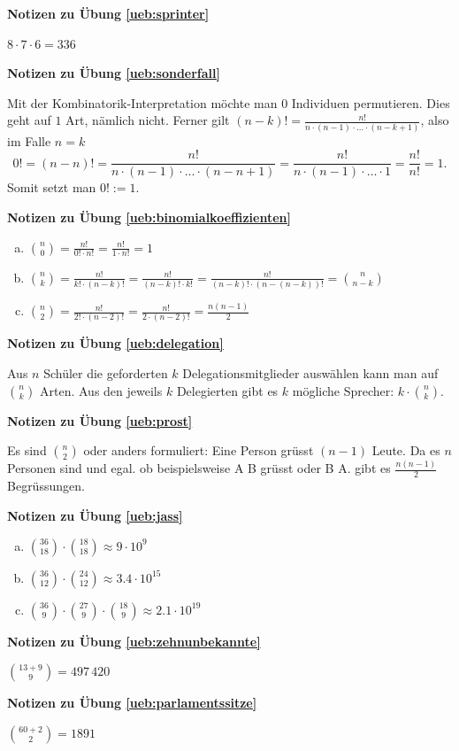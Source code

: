 \documentclass[%
<<<<<<< Updated upstream
<<<<<<< Updated upstream
11pt,%
twoside,%
titlepage,%
german,%
=======
=======
>>>>>>> Stashed changes
11pt,%
twoside,%
titlepage,%
swissgerman,%
<<<<<<< Updated upstream
>>>>>>> Stashed changes
=======
>>>>>>> Stashed changes
headsepline%
]{scrartcl}
\newcommand{\faReturnGray}{\textcolor{gray}{\faMailReply}} %
\theoremstyle{definition}
\theoremstyle{plain}
\newcommand{\concatueb}[1]{ueb:#1}%
\newcommand{\concatlsg}[1]{lsg:#1}%
\newenvironment{lsg}[1]{%
    \par\noindent\textbf{Notizen zu Übung \ref{\concatueb{#1}}}\label{\concatlsg{#1}}
    \hfill\hyperref[\concatueb{#1}]{\faReturnGray}\par %
}{%
    \par%
}
\newcommand{\concatueb}[1]{ueb:#1}%
\newcommand{\concatlsg}[1]{lsg:#1}%
\newenvironment{lsg}[1]{%
    \par\noindent\textbf{Notizen zu Übung \ref{\concatueb{#1}}.}%
    \label{\concatlsg{#1}}
}{%
    \par%
}
\begin{document}
\begin{lsg}{sprinter}
$8\cdot7\cdot6=336$
\end{lsg}
\begin{lsg}{sonderfall}
Mit der Kombinatorik-Interpretation m\"ochte man $0$ Individuen permutieren. Dies geht auf $1$ Art, n\"amlich nicht. Ferner gilt $(n-k)!=\frac{n!}{n\cdot(n-1)\cdot\dots\cdot(n-k+1)}$, also im Falle $n=k$
$$0!=(n-n)!=\frac{n!}{n\cdot(n-1)\cdot\dots\cdot(n-n+1)}=\frac{n!}{n\cdot(n-1)\cdot\dots\cdot1}=\frac{n!}{n!}=1.$$
Somit setzt man $0!:=1$.
\end{lsg}
\begin{lsg}{binomialkoeffizienten}
\begin{enumerate}[a)]
\item $\binom{n}{0}=\frac{n!}{0!\cdot n!}=\frac{n!}{1\cdot n!}=1$
\item $\binom{n}{k}=\frac{n!}{k!\cdot (n-k)!}=\frac{n!}{(n-k)!\cdot k!}=\frac{n!}{(n-k)!\cdot (n-(n-k))!}=\binom{n}{n-k}$
\item $\binom{n}{2}=\frac{n!}{2!\cdot(n-2)!}=\frac{n!}{2\cdot(n-2)!}=\frac{n(n-1)}{2}$
\end{enumerate}
\end{lsg}
\begin{lsg}{delegation}
Aus $n$ Schüler die geforderten $k$ Delegationsmitglieder ausw\"ahlen kann man auf $\binom{n}{k}$ Arten. Aus den jeweils $k$ Delegierten gibt es $k$ m\"ogliche Sprecher: $k\cdot\binom{n}{k}$.
\end{lsg}
\begin{lsg}{prost}
Es sind $\binom{n}{2}$ oder anders formuliert: Eine Person gr\"usst $(n-1)$ Leute. Da es $n$ Personen sind und egal. ob beispielsweise A B gr\"usst oder B A. gibt es $\frac{n(n-1)}{2}$ Begr\"ussungen.
\end{lsg}
\begin{lsg}{jass}
\begin{enumerate}[a)]
\item $\binom{36}{18}\cdot\binom{18}{18}\approx9\cdot10^{9}$
\item $\binom{36}{12}\cdot\binom{24}{12}\approx3.4\cdot10^{15}$
\item $\binom{36}{9}\cdot\binom{27}{9}\cdot\binom{18}{9}\approx2.1\cdot10^{19}$
\end{enumerate}
\end{lsg}
\begin{lsg}{zehnunbekannte}
$\binom{13+9}{9}=497\,420$
\end{lsg}
\begin{lsg}{parlamentssitze}
$\binom{60+2}{2}=1891$
\end{lsg}
\end{document}
